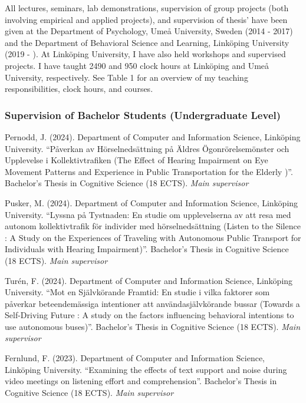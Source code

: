 \documentclass[]{article}
\begin{document}
All lectures, seminars, lab demonstrations, supervision of group
projects (both involving empirical and applied projects), and
supervision of thesis' have been given at the Department of Psychology,
Umeå University, Sweden (2014 - 2017) and the Department of Behavioral
Science and Learning, Linköping University (2019 - ). At Linköping
University, I have also held workshops and supervised projects. I have
taught 2490 and 950 clock hours at Linköping and Umeå University,
respectively. See Table 1 for an overview of my teaching
responsibilities, clock hours, and courses.

\subsubsection{Supervision of Bachelor Students (Undergraduate
Level)}\label{supervision-of-bachelor-students-undergraduate-level}

Pernodd, J. (2024). Department of Computer and Information Science,
Linköping University. ``Påverkan av Hörselnedsättning på Äldres
Ögonrörelsemönster och Upplevelse i Kollektivtrafiken (The Effect of
Hearing Impairment on Eye Movement Patterns and Experience in Public
Transportation for the Elderly )''. Bachelor's Thesis in Cognitive
Science (18 ECTS). \emph{Main supervisor}

Pusker, M. (2024). Department of Computer and Information Science,
Linköping University. ``Lyssna på Tystnaden: En studie om upplevelserna
av att resa med autonom kollektivtrafik för individer med
hörselnedsättning (Listen to the Silence : A Study on the Experiences of
Traveling with Autonomous Public Transport for Individuals with Hearing
Impairment)''. Bachelor's Thesis in Cognitive Science (18 ECTS).
\emph{Main supervisor}

Turén, F. (2024). Department of Computer and Information Science,
Linköping University. ``Mot en Självkörande Framtid: En studie i vilka
faktorer som påverkar beteendemässiga intentioner att
användasjälvkörande bussar (Towards a Self-Driving Future : A study on
the factors influencing behavioral intentions to use autonomous
buses)''. Bachelor's Thesis in Cognitive Science (18 ECTS). \emph{Main
supervisor}

Fernlund, F. (2023). Department of Computer and Information Science,
Linköping University. ``Examining the effects of text support and noise
during video meetings on listening effort and comprehension''.
Bachelor's Thesis in Cognitive Science (18 ECTS). \emph{Main supervisor}
\end{document}
